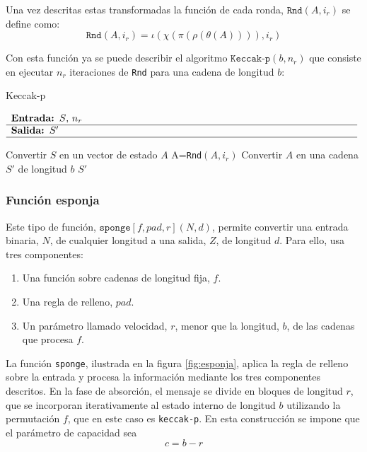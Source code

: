 Una vez descritas estas transformadas la función de cada ronda, \(\texttt{Rnd}(A,i_r)\) se define como:
\begin{equation}
	\texttt{Rnd}(A,i_r)=\iota(\chi(\pi(\rho(\theta(A)))),i_r)
\end{equation}

Con esta función ya se puede describir el algoritmo \(\texttt{Keccak-p}(b,n_r)\) que consiste en ejecutar \(n_r\) iteraciones de \texttt{Rnd} para una cadena de longitud \(b\):

\begin{algorithm}[H]
\caption{Keccak-p}
$\begin{array}{p{\textwidth}}
	\textbf{Entrada: }\(S\), \(n_r\) \\ 
	\hline
	\textbf{Salida: }\(S'\)\\ 
	\hline
\end{array}$
\begin{algorithmic}[1]
	\State Convertir \(S\) en un vector de estado \(A\)
	\State A=\texttt{Rnd}$(A,i_r)$
	\EndFor
	\State Convertir \(A\) en una cadena \(S'\) de longitud \(b\)
	\State \Return \(S'\)
\end{algorithmic}
\end{algorithm}
\subsubsection{Función esponja}
Este tipo de función, $\texttt{sponge}[f,pad,r](N,d)$, permite convertir una entrada binaria, \(N\), de cualquier longitud a una salida, \(Z\), de longitud \(d\). Para ello, usa tres componentes:
\begin{enumerate}
	\item Una función sobre cadenas de longitud fija, \(f\).
	\item Una regla de relleno, \(pad\).
	\item Un parámetro llamado velocidad, \(r\), menor que la longitud, \(b\), de las cadenas que procesa \(f\).
\end{enumerate}

La función \texttt{sponge}, ilustrada en la figura \ref{fig:esponja}, aplica la regla de relleno sobre la entrada y procesa la información mediante los tres componentes descritos. En la fase de absorción, el mensaje se divide en bloques de longitud \(r\), que se incorporan iterativamente al estado interno de longitud \(b\) utilizando la permutación \(f\), que en este caso es \texttt{keccak-p}. En esta construcción se impone que el parámetro de capacidad sea
\begin{equation}
	c = b - r
\end{equation}

